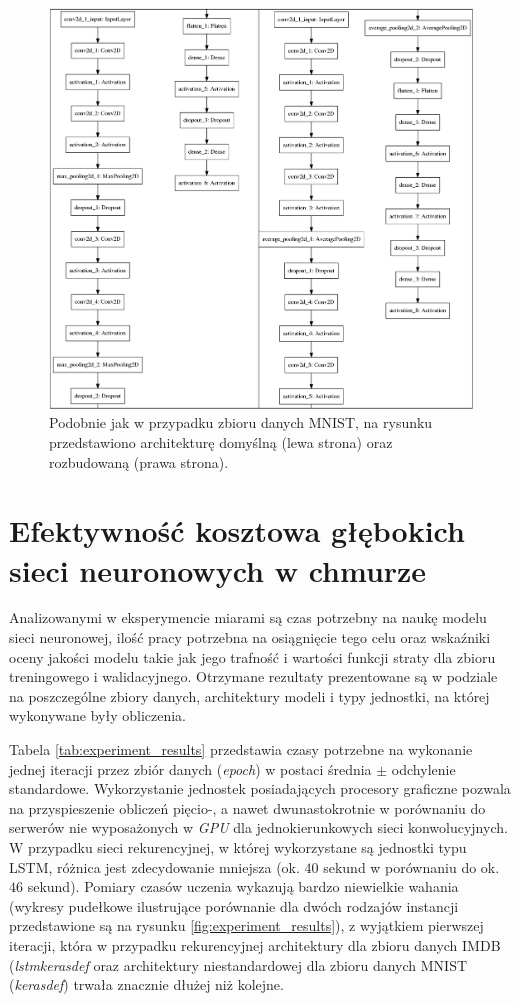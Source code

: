 \documentclass[12pt,a4paper,twoside]{article}
\begin{document}
\begin{figure}[h]
  \centering
\includegraphics[scale=0.35]{../obrazy/fig:cifar_cnn.png}
\caption{Podobnie jak w przypadku zbioru danych MNIST, na rysunku przedstawiono architekturę domyślną (lewa strona) oraz rozbudowaną (prawa strona).\label{fig:cifar_cnn}}
\end{figure}

\clearpage

\section{Efektywność kosztowa głębokich sieci neuronowych w chmurze}

\noindent
Analizowanymi w eksperymencie miarami są czas potrzebny na naukę modelu sieci neuronowej, ilość pracy potrzebna na osiągnięcie tego celu oraz wskaźniki oceny jakości modelu takie jak jego trafność i wartości funkcji straty dla zbioru treningowego i walidacyjnego. Otrzymane rezultaty prezentowane są w podziale na poszczególne zbiory danych, architektury modeli i typy jednostki, na której wykonywane były obliczenia.

Tabela \ref{tab:experiment_results} przedstawia czasy potrzebne na wykonanie jednej iteracji przez zbiór danych (\textit{epoch}) w postaci średnia $\pm$ odchylenie standardowe. Wykorzystanie jednostek posiadających procesory graficzne pozwala na przyspieszenie obliczeń pięcio-, a nawet dwunastokrotnie w porównaniu do serwerów nie wyposażonych w \textit{GPU} dla jednokierunkowych sieci konwolucyjnych. W przypadku sieci rekurencyjnej, w której wykorzystane są jednostki typu LSTM, różnica jest zdecydowanie mniejsza (ok. $40$ sekund w porównaniu do ok. $46$ sekund). Pomiary czasów uczenia wykazują bardzo niewielkie wahania (wykresy pudełkowe ilustrujące porównanie dla dwóch rodzajów instancji przedstawione są na rysunku \ref{fig:experiment_results}), z wyjątkiem pierwszej iteracji, która w przypadku rekurencyjnej architektury dla zbioru danych IMDB (\textit{lstmkerasdef} oraz architektury niestandardowej dla zbioru danych MNIST (\textit{kerasdef}) trwała znacznie dłużej niż kolejne.
\end{document}
